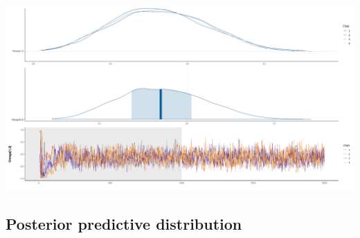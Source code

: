 \documentclass[
  12pt,
]{book}
\begin{document}
\includegraphics{Recursos/05_Empleo/09_omega.png}

\hypertarget{posterior-predictive-distribution}{%
\subsection{Posterior predictive distribution}\label{posterior-predictive-distribution}}
\end{document}
